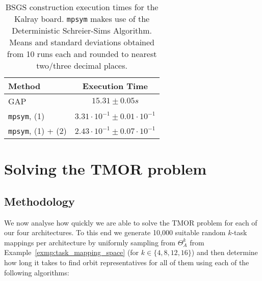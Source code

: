 \begin{table}[h!]
  \centering
  \begin{tabular}[t]{lc}
    \toprule
    Method                    & Execution Time \\
    \hline
    GAP                       & $15.31 \pm 0.05s$ \\
    \texttt{mpsym}, (1)       & $3.31 \cdot 10^{-1} \pm 0.01 \cdot 10^{-1}$ \\
    \texttt{mpsym}, (1) + (2) & $2.43 \cdot 10^{-1} \pm 0.07 \cdot 10^{-1}$ \\
    \bottomrule
  \end{tabular}
  \caption{BSGS construction execution times for the Kalray board.
           \texttt{mpsym} makes use of the Deterministic Schreier-Sims Algorithm.
           Means and standard deviations obtained from 10 runs each and
           rounded to nearest two/three decimal places.}
  \label{tab:bsgs_kalray}
\end{table}

\section{Solving the TMOR problem}
\label{sec:exp_repr}

\subsection{Methodology}
\label{sec:exp_repr_methodology}

We now analyse how quickly we are able to solve the TMOR problem for each of
our four architectures. To this end we generate 10,000 suitable random $k$-task
mappings per architecture by uniformly sampling from $\Theta_A^k$ from
Example~\ref{exmp:task_mapping_space} (for $k \in \{4,8,12,16\}$) and then
determine how long it takes to find orbit representatives for all of them using
each of the following algorithms:

